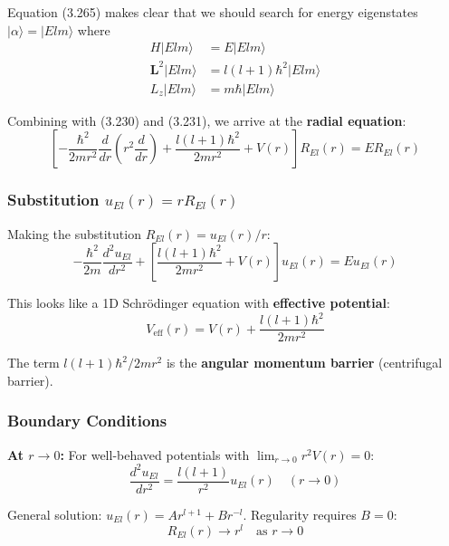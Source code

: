 \documentclass[11pt,a4paper]{article}
\begin{document}
Equation (3.265) makes clear that we should search for energy eigenstates $|\alpha\rangle = |Elm\rangle$ where
\begin{align}
H|Elm\rangle &= E|Elm\rangle \tag{3.266} \\
\mathbf{L}^2|Elm\rangle &= l(l+1)\hbar^2|Elm\rangle \tag{3.267} \\
L_z|Elm\rangle &= m\hbar|Elm\rangle \tag{3.268}
\end{align}

Combining with (3.230) and (3.231), we arrive at the \textbf{radial equation}:
\begin{equation}
\boxed{\left[-\frac{\hbar^2}{2mr^2}\frac{d}{dr}\left(r^2\frac{d}{dr}\right) + \frac{l(l+1)\hbar^2}{2mr^2} + V(r)\right]R_{El}(r) = ER_{El}(r)}
\tag{3.269}
\end{equation}

\subsubsection{Substitution $u_{El}(r) = rR_{El}(r)$}

Making the substitution $R_{El}(r) = u_{El}(r)/r$:
\begin{equation}
\boxed{-\frac{\hbar^2}{2m}\frac{d^2 u_{El}}{dr^2} + \left[\frac{l(l+1)\hbar^2}{2mr^2} + V(r)\right]u_{El}(r) = Eu_{El}(r)}
\tag{3.271}
\end{equation}

This looks like a 1D Schrödinger equation with \textbf{effective potential}:
\begin{equation}
\boxed{V_{\text{eff}}(r) = V(r) + \frac{l(l+1)\hbar^2}{2mr^2}}
\tag{3.273}
\end{equation}

The term $l(l+1)\hbar^2/2mr^2$ is the \textbf{angular momentum barrier} (centrifugal barrier).

\subsubsection{Boundary Conditions}

\textbf{At $r \to 0$:} For well-behaved potentials with $\lim_{r\to 0}r^2 V(r) = 0$:
\begin{equation}
\frac{d^2 u_{El}}{dr^2} = \frac{l(l+1)}{r^2}u_{El}(r) \quad (r \to 0)
\tag{3.274}
\end{equation}

General solution: $u_{El}(r) = Ar^{l+1} + Br^{-l}$. Regularity requires $B = 0$:
\begin{equation}
\boxed{R_{El}(r) \to r^l \quad \text{as } r \to 0}
\tag{3.276}
\end{equation}
\end{document}
